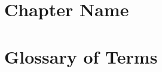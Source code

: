 \documentclass[12pt, openany]{book}
\begin{document}
\let\cleardoublepage\clearpage
\mainmatter
\chapter{Chapter Name}\label{chap:name}


\chapter{Glossary of Terms}
\printnoidxglossary


\glsaddallunused 
\end{document}
